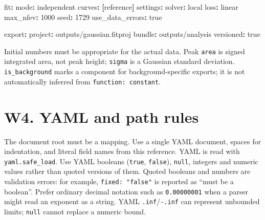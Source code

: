 \documentclass[
  10pt,
  a4paper,
  oneside]{scrreprt}
\newenvironment{Shaded}{}{}
\newcommand{\AttributeTok}[1]{\textcolor[rgb]{0.49,0.56,0.16}{#1}}
\newcommand{\CharTok}[1]{\textcolor[rgb]{0.25,0.44,0.63}{#1}}
\newcommand{\DecValTok}[1]{\textcolor[rgb]{0.25,0.63,0.44}{#1}}
\newcommand{\FunctionTok}[1]{\textcolor[rgb]{0.02,0.16,0.49}{#1}}
\newcommand{\KeywordTok}[1]{\textcolor[rgb]{0.00,0.44,0.13}{\textbf{#1}}}
\begin{document}
\begin{Shaded}
\begin{Highlighting}[]
\FunctionTok{fit}\KeywordTok{:}
\AttributeTok{  }\FunctionTok{mode}\KeywordTok{:}\AttributeTok{ independent}
\AttributeTok{  }\FunctionTok{curves}\KeywordTok{:}\AttributeTok{ }\KeywordTok{[}\AttributeTok{reference}\KeywordTok{]}
\AttributeTok{  }\FunctionTok{settings}\KeywordTok{:}
\AttributeTok{    }\FunctionTok{solver}\KeywordTok{:}\AttributeTok{ local}
\AttributeTok{    }\FunctionTok{loss}\KeywordTok{:}\AttributeTok{ linear}
\AttributeTok{    }\FunctionTok{max\_nfev}\KeywordTok{:}\AttributeTok{ }\DecValTok{1000}
\AttributeTok{    }\FunctionTok{seed}\KeywordTok{:}\AttributeTok{ }\DecValTok{1729}
\AttributeTok{    }\FunctionTok{use\_data\_errors}\KeywordTok{:}\AttributeTok{ }\CharTok{true}

\FunctionTok{export}\KeywordTok{:}
\AttributeTok{  }\FunctionTok{project}\KeywordTok{:}\AttributeTok{ outputs/gaussian.fitproj}
\AttributeTok{  }\FunctionTok{bundle}\KeywordTok{:}\AttributeTok{ outputs/analysis}
\AttributeTok{  }\FunctionTok{versioned}\KeywordTok{:}\AttributeTok{ }\CharTok{true}
\end{Highlighting}
\end{Shaded}

Initial numbers must be appropriate for the actual data. Peak
\texttt{area} is signed integrated area, not peak height; \texttt{sigma}
is a Gaussian standard deviation. \texttt{is\_background} marks a
component for background-specific exports; it is not automatically
inferred from \texttt{function:\ constant}.

\hypertarget{w4.-yaml-and-path-rules}{%
\section{W4. YAML and path rules}\label{w4.-yaml-and-path-rules}}

The document root must be a mapping. Use a single YAML document, spaces
for indentation, and literal field names from this reference. YAML is
read with \texttt{yaml.safe\_load}. Use YAML booleans (\texttt{true},
\texttt{false}), \texttt{null}, integers and numeric values rather than
quoted versions of them. Quoted booleans and numbers are validation
errors: for example, \texttt{fixed:\ "false"} is reported as ``must be a
boolean''. Prefer ordinary decimal notation such as \texttt{0.00000001}
when a parser might read an exponent as a string. YAML
\texttt{.inf}/\texttt{-.inf} can represent unbounded limits;
\texttt{null} cannot replace a numeric bound.
\end{document}

